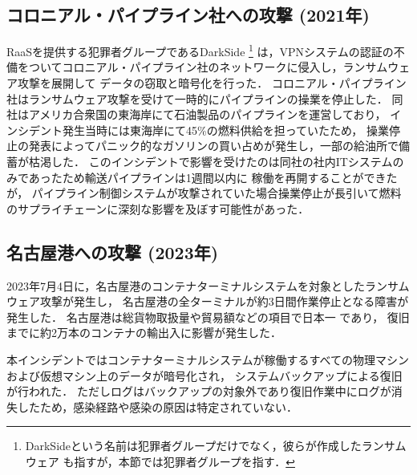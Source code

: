 \subsection{コロニアル・パイプライン社への攻撃 (2021年)}
RaaSを提供する犯罪者グループであるDarkSide \footnote{DarkSideという名前は犯罪者グループだけでなく，彼らが作成したランサムウェア \cite{DarkSide42:online}
  も指すが，本節では犯罪者グループを指す．}
は，VPNシステムの認証の不備をついてコロニアル・パイプライン社のネットワークに侵入し，ランサムウェア攻撃を展開して
データの窃取と暗号化を行った\cite{colonial-pipeline-attack}．
コロニアル・パイプライン社はランサムウェア攻撃を受けて一時的にパイプラインの操業を停止した．
同社はアメリカ合衆国の東海岸にて石油製品のパイプラインを運営しており，
インシデント発生当時には東海岸にて45\%の燃料供給を担っていたため，
操業停止の発表によってパニック的なガソリンの買い占めが発生し，一部の給油所で備蓄が枯渇した．
このインシデントで影響を受けたのは同社の社内ITシステムのみであったため輸送パイプラインは1週間以内に
稼働を再開することができたが，
パイプライン制御システムが攻撃されていた場合操業停止が長引いて燃料のサプライチェーンに深刻な影響を及ぼす可能性があった．

\subsection{名古屋港への攻撃 (2023年)}
2023年7月4日に，名古屋港のコンテナターミナルシステムを対象としたランサムウェア攻撃が発生し，
名古屋港の全ターミナルが約3日間作業停止となる障害が発生した\cite{nagoya-port-attack}．
名古屋港は総貨物取扱量や貿易額などの項目で日本一 \cite{nagoya-port-no1} であり，
復旧までに約2万本のコンテナの輸出入に影響が発生した．

本インシデントではコンテナターミナルシステムが稼働するすべての物理マシンおよび仮想マシン上のデータが暗号化され，
システムバックアップによる復旧が行われた．
ただしログはバックアップの対象外であり復旧作業中にログが消失したため，感染経路や感染の原因は特定されていない．

